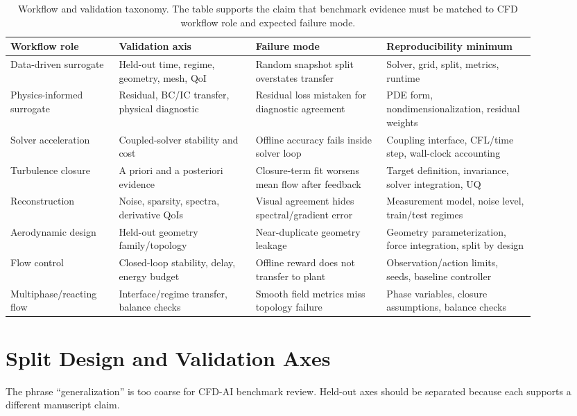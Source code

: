 \documentclass[11pt]{article}
\begin{document}
\begin{table}[h]
\centering
\small
\begin{tabular}{p{0.18\linewidth}p{0.23\linewidth}p{0.22\linewidth}p{0.25\linewidth}}
\toprule
Workflow role & Validation axis & Failure mode & Reproducibility minimum \\
\midrule
Data-driven surrogate & Held-out time, regime, geometry, mesh, QoI & Random snapshot split overstates transfer & Solver, grid, split, metrics, runtime \\
Physics-informed surrogate & Residual, BC/IC transfer, physical diagnostic & Residual loss mistaken for diagnostic agreement & PDE form, nondimensionalization, residual weights \\
Solver acceleration & Coupled-solver stability and cost & Offline accuracy fails inside solver loop & Coupling interface, CFL/time step, wall-clock accounting \\
Turbulence closure & A priori and a posteriori evidence & Closure-term fit worsens mean flow after feedback & Target definition, invariance, solver integration, UQ \\
Reconstruction & Noise, sparsity, spectra, derivative QoIs & Visual agreement hides spectral/gradient error & Measurement model, noise level, train/test regimes \\
Aerodynamic design & Held-out geometry family/topology & Near-duplicate geometry leakage & Geometry parameterization, force integration, split by design \\
Flow control & Closed-loop stability, delay, energy budget & Offline reward does not transfer to plant & Observation/action limits, seeds, baseline controller \\
Multiphase/reacting flow & Interface/regime transfer, balance checks & Smooth field metrics miss topology failure & Phase variables, closure assumptions, balance checks \\
\bottomrule
\end{tabular}
\caption{Workflow and validation taxonomy. The table supports the claim that benchmark evidence must be matched to CFD workflow role and expected failure mode.}
\end{table}

\section{Split Design and Validation Axes}
The phrase ``generalization'' is too coarse for CFD-AI benchmark review. Held-out axes should be separated because each supports a different manuscript claim.
\end{document}
